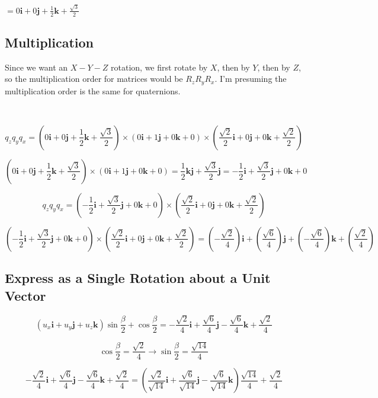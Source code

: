 \documentclass[11pt]{article}
\begin{document}
\begin{spacing}{1.2}
 $ = 0 \mathbf{i} + 0\mathbf{j} + \frac{1}{2}\mathbf{k} + \frac{\sqrt3}{2}$


\subsection{Multiplication}

Since we want an $X-Y-Z$ rotation, we first rotate by $X$, then by $Y$, then by $Z$, so the multiplication order for matrices would be $R_z R_y R_x$.  I'm presuming the multiplication order is the same for quaternions.  

\

$$q_z q_y q_x 
=  
\left(0 \mathbf{i} + 0\mathbf{j} + \frac{1}{2}\mathbf{k} + \frac{\sqrt3}{2}\right)
\times
\left(0 \mathbf{i} + 1\mathbf{j} + 0\mathbf{k} + 0\right)
\times
\left(\frac{\sqrt2}{2}\mathbf{i} + 0\mathbf{j} + 0\mathbf{k}  + \frac{\sqrt2}{2}\right)
$$

$$\left(0 \mathbf{i} + 0\mathbf{j} + \frac{1}{2}\mathbf{k} + \frac{\sqrt3}{2}\right)
\times
\left(0 \mathbf{i} + 1\mathbf{j} + 0\mathbf{k} + 0\right)
 = \frac{1}{2} \mathbf{kj} + \frac{\sqrt3}{2}\mathbf{j}
 = -\frac{1}{2} \mathbf{i} + \frac{\sqrt3}{2}\mathbf{j} + 0 \mathbf{k} + 0
 $$

$$q_z q_y q_x 
=  
\left(-\frac{1}{2} \mathbf{i} + \frac{\sqrt3}{2}\mathbf{j} + 0 \mathbf{k} + 0\right)
\times
\left(\frac{\sqrt2}{2}\mathbf{i} + 0\mathbf{j} + 0\mathbf{k}  + \frac{\sqrt2}{2}\right)
$$

$$
\left(-\frac{1}{2} \mathbf{i} + \frac{\sqrt3}{2}\mathbf{j} + 0 \mathbf{k} + 0\right)
\times
\left(\frac{\sqrt2}{2}\mathbf{i} + 0\mathbf{j} + 0\mathbf{k}  + \frac{\sqrt2}{2}\right)
= \left( -\frac{\sqrt2}{4}\right)\mathbf{i}
+ \left( \frac{\sqrt6}{4}  \right) \mathbf{j}
+ \left(- \frac{\sqrt6}{4} \right) \mathbf{k}
+ \left( \frac{\sqrt2}{4}\right)
$$

\subsection{Express as a Single Rotation about a Unit Vector}

$$
\left(u_x \mathbf{i} + u_y \mathbf{j} + u_z \mathbf{k} \right) \sin \frac{\beta}{2} + \cos \frac{\beta}{2} = 
-\frac{\sqrt2}{4}\mathbf{i}
+ \frac{\sqrt6}{4}\mathbf{j}
- \frac{\sqrt6}{4}\mathbf{k}
+ \frac{\sqrt2}{4}
$$

$$\cos \frac{\beta}{2} = \frac{\sqrt2}{4} \to \sin \frac{\beta}{2} = \frac{\sqrt{14}}{4}$$

$$
-\frac{\sqrt2}{4}\mathbf{i}
+ \frac{\sqrt6}{4}\mathbf{j}
- \frac{\sqrt6}{4}\mathbf{k}
+ \frac{\sqrt2}{4} = 
\left(
	\frac{\sqrt2}{\sqrt{14}} \mathbf{i} + 
	\frac{\sqrt6}{\sqrt{14}} \mathbf{j} -
	\frac{\sqrt6}{\sqrt{14}} \mathbf{k}
\right)
\frac{\sqrt{14}}{4} + \frac{\sqrt2}{4}
$$


\end{spacing}
\end{document}
